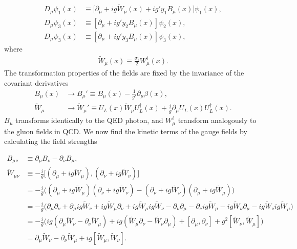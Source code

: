 \documentclass[11pt]{article}
\begin{document}
\begin{multicols}{2}
\begin{flushleft}
\begin{align*}
D_{\mu} \psi_1(x) & \equiv \Big[\partial_{\mu} + ig \tilde{W}_{\mu}(x) + ig' y_1 B_{\mu}(x) \Big] \psi_1(x),\\
D_{\mu} \psi_3(x) & \equiv [\partial_{\mu} + ig'y_2 B_{\mu}(x)] \psi_2(x),\\
D_{\mu} \psi_3(x) & \equiv [\partial_{\mu} + ig'y_3 B_{\mu}(x)] \psi_3(x),
\end{align*}
where
\begin{align*}
\tilde{W}_{\mu}(x) \equiv \frac{\sigma_i}{2} W^i_{\mu}(x).
\end{align*}
The transformation properties of the fields are fixed by the invariance of the covariant derivatives
\begin{align*}
B_{\mu} (x) & \rightarrow B_{\mu}' \equiv B_{\mu}(x)-\frac{1}{g'} \partial_{\mu} \beta (x),\\
\tilde{W}_{\mu} & \rightarrow \tilde{W}_{\mu}' \equiv U_L(x) \tilde{W}_{\mu} U_L^{\dagger} (x) +\frac{i}{g} \partial_{\mu} U_L(x) U_L^{\dagger} (x).
\end{align*}
$B_{\mu}$ transforms identically to the QED photon, and $W_{\mu}^i$ transform analogously to the gluon fields in QCD. We now find the kinetic terms of the gauge fields by calculating the field strengths
\end{flushleft}
\end{multicols}
\begin{align*}
B_{\mu \nu} & \equiv \partial_{\mu} B_{\nu} - \partial_{\nu} B_{\mu},\\
\tilde{W}_{\mu \nu} & \equiv - \frac{i}{g} \Big[ (\partial_{\mu} + ig \tilde{W}_{\mu}), (\partial_{\nu} + ig \tilde{W}_{\nu}) \Big]\\
&= -\frac{i}{g} \Big((\partial_{\mu} + ig \tilde{W}_{\mu}) (\partial_{\nu} + ig \tilde{W}_{\nu}) - (\partial_{\nu} + ig \tilde{W}_{\nu})(\partial_{\mu} + ig \tilde{W}_{\mu}) \Big)\\
&= -\frac{i}{g} \Big(
\partial_{\mu} \partial_{\nu} + \partial_{\mu}ig \tilde{W}_{\nu}
+ ig \tilde{W}_{\mu} \partial_{\nu} + ig \tilde{W}_{\mu} ig \tilde{W}_{\nu}
- \partial_{\nu}\partial_{\mu} - \partial_{\nu}ig \tilde{W}_{\mu}
- ig \tilde{W}_{\nu}\partial_{\mu} - ig \tilde{W}_{\nu} ig \tilde{W}_{\mu} 
\Big)\\
&= -\frac{i}{g} \Big(
 ig(\partial_{\mu} \tilde{W}_{\nu}
 - \partial_{\nu} \tilde{W}_{\mu})
+ ig (\tilde{W}_{\mu} \partial_{\nu}
- \tilde{W}_{\nu}\partial_{\mu} )
+ [\partial_{\mu}, \partial_{\nu}]
+ g^2 [\tilde{W}_{\nu}, \tilde{W}_{\mu}] 
\Big)\\
&= \partial_{\mu} \tilde{W}_{\nu}
 - \partial_{\nu} \tilde{W}_{\mu}
+i g [\tilde{W}_{\mu}, \tilde{W}_{\nu}]. \\
\end{align*}
\end{document}
